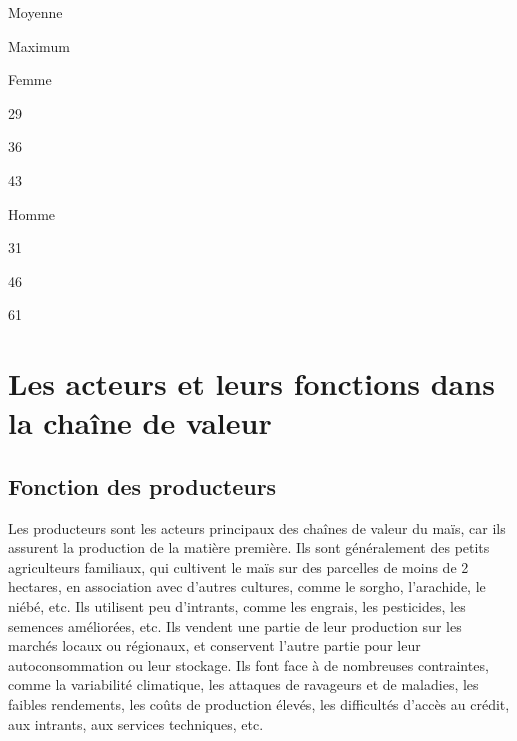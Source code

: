 \documentclass[12pt,oneside]{report}
\begin{document}
Moyenne

Maximum

Femme

29

36

43

Homme

31

46

61

\section{Les acteurs et leurs fonctions dans la chaîne de valeur}
\subsection{Fonction des producteurs}
Les producteurs sont les acteurs principaux des chaînes de valeur du maïs, car ils assurent la production de la matière première. Ils sont généralement des petits agriculteurs familiaux, qui cultivent le maïs sur des parcelles de moins de 2 hectares, en association avec d'autres cultures, comme le sorgho, l’arachide, le niébé, etc. Ils utilisent peu d'intrants, comme les engrais, les pesticides, les semences améliorées, etc. Ils vendent une partie de leur production sur les marchés locaux ou régionaux, et conservent l'autre partie pour leur autoconsommation ou leur stockage. Ils font face à de nombreuses contraintes, comme la variabilité climatique, les attaques de ravageurs et de maladies, les faibles rendements, les coûts de production élevés, les difficultés d'accès au crédit, aux intrants, aux services techniques, etc.
\end{document}
